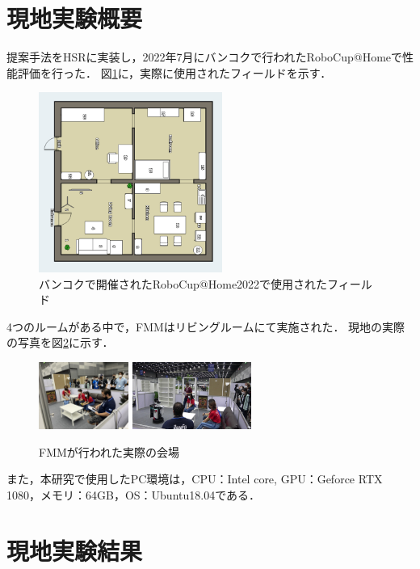 \documentclass[a4j]{jarticle}
\begin{document}
\section{現地実験概要}
提案手法をHSRに実装し，2022年7月にバンコクで行われたRoboCup@Homeで性能評価を行った．
図\ref{robocup_field}に，実際に使用されたフィールドを示す．
\begin{figure}[ht]
  \centering
  \includegraphics[width=6cm]{images/robocup/arenaBangkok_rotate.png}
  \caption{バンコクで開催されたRoboCup@Home2022で使用されたフィールド}
  \label{robocup_field}
\end{figure}
4つのルームがある中で，FMMはリビングルームにて実施された．
現地の実際の写真を図\ref{onsite_overview_1}に示す．
\begin{figure}[ht]
  \centering
  \includegraphics[height=2.2cm]{images/robocup/FMM_onsite_overview_1.jpg}
  \includegraphics[height=2.2cm]{images/robocup/FMM_onsite_overview_3.jpg}
  \caption{FMMが行われた実際の会場}
  \label{onsite_overview_1}
\end{figure}

また，本研究で使用したPC環境は，CPU：Intel core, GPU：Geforce RTX 1080，メモリ：64GB，OS：Ubuntu18.04である．

\section{現地実験結果}
\end{document}
